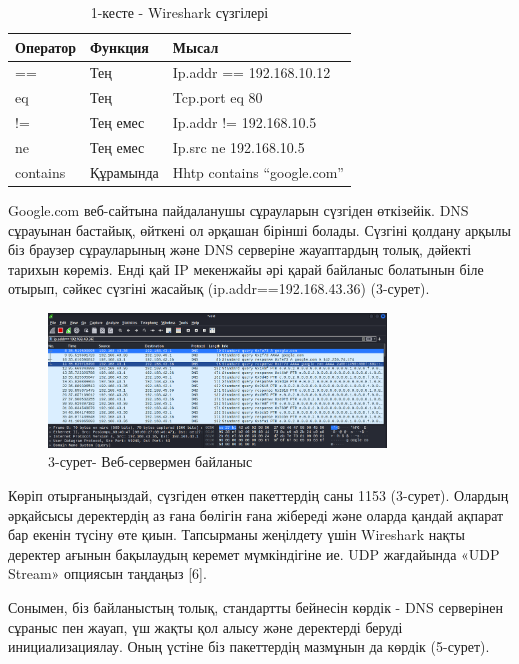 \begin{table}[H]
\caption*{1-кесте - Wireshark сүзгілері}
\centering
\begin{tabular}{|l|l|l|}
\hline
Оператор & Функция     & Мысал                         \\ \hline
==       & Тең         & Ip.addr 			== 192.168.10.12   \\ \hline
eq       & Тең         & Tcp.port 			eq 80             \\ \hline
!=       & Тең 			емес & Ip.addr 			!= 192.168.10.5    \\ \hline
ne       & Тең 			емес & Ip.src 			ne 192.168.10.5     \\ \hline
contains & Құрамында   & Hhtp 			contains “google.com” \\ \hline
\end{tabular}
\end{table}

\begin{multicols}{2}
Google.com веб-сайтына пайдаланушы сұрауларын сүзгіден өткізейік. DNS
сұрауынан бастайық, өйткені ол әрқашан бірінші болады. Сүзгіні қолдану
арқылы біз браузер сұрауларының және DNS серверіне жауаптардың толық,
дәйекті тарихын көреміз. Енді қай IP мекенжайы әрі қарай байланыс
болатынын біле отырып, сәйкес сүзгіні жасайық (ip.addr==192.168.43.36)
(3-сурет).
\end{multicols}

\begin{figure}[H]
	\centering
	\includegraphics[width=0.8\textwidth]{assets/28}
	\caption*{3-сурет- Веб-сервермен байланыс}
\end{figure}

\begin{multicols}{2}
Көріп отырғаныңыздай, сүзгіден өткен пакеттердің саны 1153 (3-сурет).
Олардың әрқайсысы деректердің аз ғана бөлігін ғана жібереді және оларда
қандай ақпарат бар екенін түсіну өте қиын. Тапсырманы жеңілдету үшін
Wireshark нақты деректер ағынын бақылаудың керемет мүмкіндігіне ие. UDP
жағдайында «UDP Stream» опциясын таңдаңыз {[}6{]}.

Сонымен, біз байланыстың толық, стандартты бейнесін көрдік - DNS
серверінен сұраныс пен жауап, үш жақты қол алысу және деректерді беруді
инициализациялау. Оның үстіне біз пакеттердің мазмұнын да көрдік
(5-сурет).
\end{multicols}

